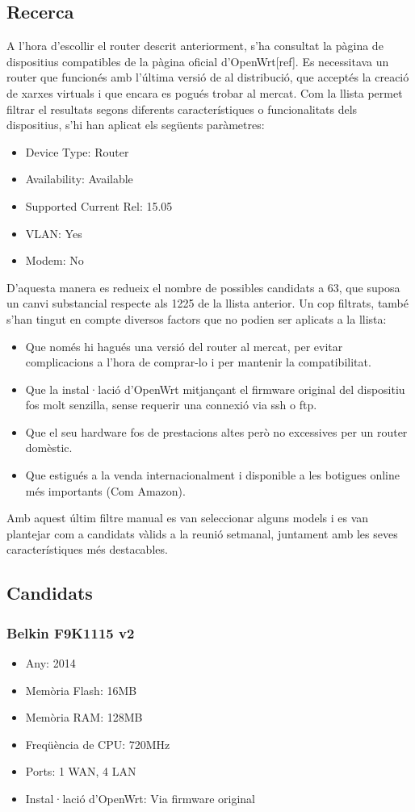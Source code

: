 \documentclass[11pt]{article}
\begin{document}
\subsection{Recerca}
A l’hora d’escollir el router descrit anteriorment, s’ha consultat la pàgina de dispositius compatibles de la pàgina oficial d’OpenWrt[ref]. Es necessitava un router que funcionés amb l’última versió de al distribució, que acceptés la creació de xarxes virtuals i que encara es pogués trobar al mercat. Com la llista permet filtrar el resultats segons diferents característiques o funcionalitats dels dispositius, s’hi han aplicat els següents paràmetres:
\begin{itemize}
\item Device Type: Router
\item Availability: Available
\item Supported Current Rel: 15.05
\item VLAN: Yes
\item Modem: No
\end{itemize}
D’aquesta manera es redueix el nombre de possibles candidats a 63, que suposa un canvi substancial respecte als 1225 de la llista anterior.
Un cop filtrats, també s’han tingut en compte diversos factors que no podien ser aplicats a la llista:
\begin{itemize}
\item Que només hi hagués una versió del router al mercat, per evitar complicacions a l’hora de comprar-lo i per mantenir la compatibilitat.
\item Que la instal·lació d’OpenWrt mitjançant el firmware original del dispositiu fos molt senzilla, sense requerir una connexió via ssh o ftp.
\item Que el seu hardware fos de prestacions altes però no excessives per un router domèstic.
\item Que estigués a la venda internacionalment i disponible a les botigues online més importants (Com Amazon).
\end{itemize}
Amb aquest últim filtre manual es van seleccionar alguns models i es van plantejar com a candidats vàlids a la reunió setmanal, juntament amb les seves característiques més destacables.

\subsection{Candidats}
\subsubsection{Belkin F9K1115 v2}
\begin{itemize}
\item Any: 2014
\item Memòria Flash: 16MB
\item Memòria RAM: 128MB
\item Freqüència de CPU: 720MHz
\item Ports: 1 WAN, 4 LAN
\item Instal·lació d’OpenWrt: Via firmware original
\end{itemize}
\end{document}
